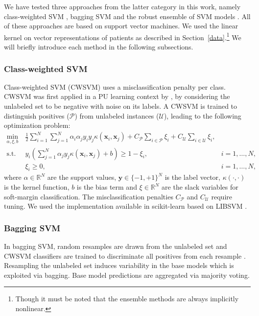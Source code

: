 \documentclass[twoside,11pt]{article}
\begin{document}
We have tested three approaches from the latter category in this work, namely class-weighted SVM \citep{Liu:2003:BTC:951949.952139}, bagging SVM \citep{mordelet2014bagging} and the robust ensemble of SVM models \citep{Claesen2015resvm}. All of these approaches are based on support vector machines. We used the linear kernel on vector representations of patients as described in Section~\ref{data}.\footnote{Though it must be noted that the ensemble methods are always implicitly nonlinear.} We will briefly introduce each method in the following subsections.

\subsubsection{Class-weighted SVM} \label{bsvm}
Class-weighted SVM (CWSVM) uses a misclassification penalty per class. CWSVM was first applied in a PU learning context by \citet{Liu:2003:BTC:951949.952139}, by considering the unlabeled set to be negative with noise on its labels. A CWSVM is trained to distinguish positives ($\mathcal{P}$) from unlabeled instances ($\mathcal{U}$), leading to the following optimization problem:
\begin{align}
\min_{\alpha,\xi,b}\ & \frac{1}{2}\sum_{i=1}^N\sum_{j=1}^N \alpha_i\alpha_j y_i y_j \kappa(\mathbf{x}_i,\mathbf{x}_j)+C_{\mathcal{P}}\sum_{i \in\mathcal{P}} \xi_i + C_{\mathcal{U}}\sum_{i\in\mathcal{U}} \xi_i, \label{eq:bsvm} \\
\text{s.t. } &y_i(\sum_{j=1}^N \alpha_j y_j \kappa(\mathbf{x}_i,\mathbf{x}_j)+b)\geq 1-\xi_i, &i=1,\ldots,N, \nonumber \\
&\xi_i \geq 0, &i=1,\ldots,N, \nonumber
\end{align}
where $\alpha \in \mathbb{R}^N$ are the support values, $\mathbf{y} \in \{-1,+1\}^N$ is the label vector, $\kappa(\cdot,\cdot)$ is the kernel function, $b$ is the bias term and $\xi \in \mathbb{R}^N$ are the slack variables for soft-margin classification. The misclassification penalties $C_{\mathcal{P}}$ and $C_{\mathcal{U}}$ require tuning. We used the implementation available in scikit-learn \citep{pedregosa2011scikit} based on LIBSVM \citep{CC01a}.

\subsubsection{Bagging SVM} \label{baggingsvm}
In bagging SVM, random resamples are drawn from the unlabeled set and CWSVM classifiers are trained to discriminate all positives from each resample \citep{mordelet2014bagging}. Resampling the unlabeled set induces variability in the base models which is exploited via bagging. Base model predictions are aggregated via majority voting.
\end{document}
